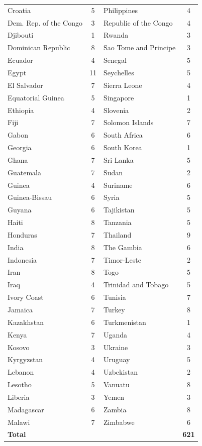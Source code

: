 \documentclass[USletter,12pt, titlepage]{article} %
\begin{document}
\begin{center}
\begin{longtable}{lc|lc}
Croatia & 5 & Philippines & 4 \\
Dem. Rep. of the Congo & 3 & Republic of the Congo & 4 \\
Djibouti & 1 & Rwanda & 3 \\
Dominican Republic & 8 & Sao Tome and Principe & 3 \\
Ecuador & 4 & Senegal & 5 \\
Egypt & 11 & Seychelles & 5 \\
El Salvador & 7 & Sierra Leone & 4 \\
Equatorial Guinea & 5 & Singapore & 1 \\
Ethiopia & 4 & Slovenia & 2 \\
Fiji & 7 & Solomon Islands & 7 \\
Gabon & 6 & South Africa & 6 \\
Georgia & 6 & South Korea & 1 \\
Ghana & 7 & Sri Lanka & 5 \\
Guatemala & 7 & Sudan & 2 \\
Guinea & 4 & Suriname & 6 \\
Guinea-Bissau & 6 & Syria & 5 \\
Guyana & 6 & Tajikistan & 5 \\
Haiti & 8 & Tanzania & 5 \\
Honduras & 7 & Thailand & 9 \\
India & 8 & The Gambia & 6 \\
Indonesia & 7 & Timor-Leste & 2 \\
Iran & 8 & Togo & 5 \\
Iraq & 4 & Trinidad and Tobago & 5 \\
Ivory Coast & 6 & Tunisia & 7 \\
Jamaica & 7 & Turkey & 8 \\
Kazakhstan & 6 & Turkmenistan & 1 \\
Kenya & 7 & Uganda & 4 \\
Kosovo & 3 & Ukraine & 3 \\
Kyrgyzstan & 4 & Uruguay & 5 \\
Lebanon & 4 & Uzbekistan & 2 \\
Lesotho & 5 & Vanuatu & 8 \\
Liberia & 3 & Yemen & 3 \\
Madagascar & 6 & Zambia & 8 \\
Malawi & 7 & Zimbabwe & 6 \\
\midrule
\multicolumn{2}{l}{\textbf{Total}} & & \textbf{621} \\
\end{longtable}
\end{center}
\end{document}
